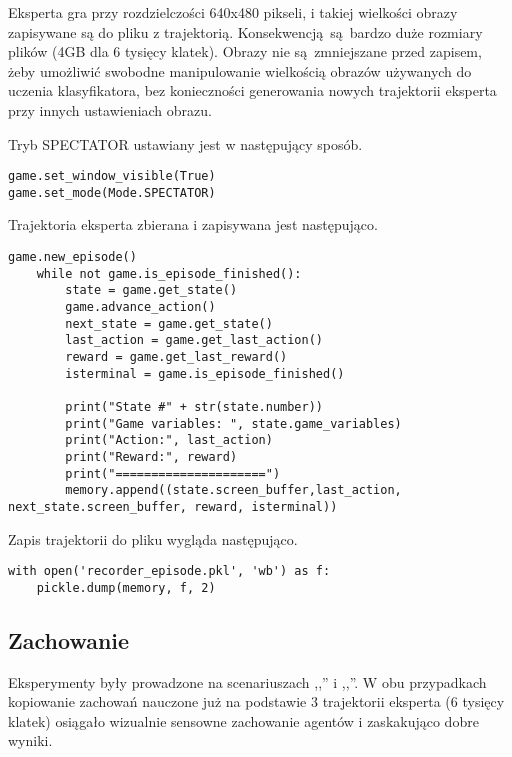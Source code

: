 Eksperta gra przy rozdzielczości 640x480 pikseli, i takiej wielkości obrazy zapisywane są do pliku z trajektorią. Konsekwencją są bardzo duże rozmiary plików (4GB dla 6 tysięcy klatek). Obrazy nie są zmniejszane przed zapisem, żeby umożliwić swobodne manipulowanie wielkością obrazów używanych do uczenia klasyfikatora, bez konieczności generowania nowych trajektorii eksperta przy innych ustawieniach obrazu.

\vspace{5mm}

Tryb SPECTATOR ustawiany jest w następujący sposób.
\begin{lstlisting}[language=iPython]
game.set_window_visible(True)
game.set_mode(Mode.SPECTATOR)
\end{lstlisting}

Trajektoria eksperta zbierana i zapisywana jest następująco.

\begin{lstlisting}[language=iPython]
    game.new_episode()
    while not game.is_episode_finished():
        state = game.get_state()
        game.advance_action()
        next_state = game.get_state()
        last_action = game.get_last_action()
        reward = game.get_last_reward()
        isterminal = game.is_episode_finished()

        print("State #" + str(state.number))
        print("Game variables: ", state.game_variables)
        print("Action:", last_action)
        print("Reward:", reward)
        print("=====================")
        memory.append((state.screen_buffer,last_action, next_state.screen_buffer, reward, isterminal))
\end{lstlisting}

Zapis trajektorii do pliku wygląda następująco.

\begin{lstlisting}[language=iPython]
with open('recorder_episode.pkl', 'wb') as f:
    pickle.dump(memory, f, 2)
\end{lstlisting}

\subsection{Zachowanie}
Eksperymenty były prowadzone na scenariuszach ,,'' i ,,''.
W obu przypadkach kopiowanie zachowań nauczone już na podstawie 3 trajektorii eksperta (6 tysięcy klatek) osiągało wizualnie sensowne zachowanie agentów i zaskakująco dobre wyniki.

